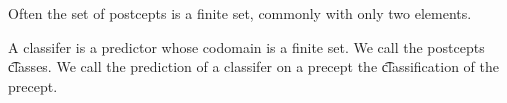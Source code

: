 
\sbasic


















\sstart
{}


Often the set of postcepts is a finite set, commonly with only two elements.


A classifer is a predictor whose codomain is a finite set.
We call the postcepts \t{classes}.
We call the prediction of a classifer on a precept the \t{classification} of the precept.
\strats
